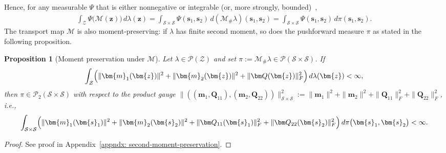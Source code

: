 \documentclass[opre,sglanonrev]{informs4}
\newtheorem{proposition}{Proposition}
\newcommand{\mZ}{\mathcal{Z}}
\newcommand{\mS}{\mathcal{S}}
\newcommand{\mM}{\mathcal{M}}
\newcommand{\mP}{\mathcal{P}}
\newcommand{\bmean}{\bm{m}}
\newcommand{\bs}{\bm{s}}
\newcommand{\bz}{\bm{z}}
\newcommand{\bQ}{\bm Q}
\begin{document}
Hence, for any measurable $\Psi$ that is either nonnegative or integrable (or, more strongly, bounded)~\cite{villani2008optimal},
\begin{align}\label{eq: push-integral-M}
\int_{\mZ}\Psi\!\bigl(\mM(\bz)\bigr)\,d\lambda(\bz)
=\int_{\mS \times \mS }\Psi(\bs_1, \bs_2)\,d(\mM_\#\lambda)(\bs_1, \bs_2)
=\int_{\mS\times \mS}\Psi(\bs_1, \bs_2)\,d\pi(\bs_1, \bs_2).
\end{align}
The transport map $\mM$ is also moment-preserving: if $\lambda$ has finite second moment, so does the pushforward measure $\pi$ as stated in the following proposition. 
\begin{proposition}[Moment preservation under $\mM$]\label{prop: finite-2nd-moment}
Let $\lambda\in \mP(\mZ)$ and set $\pi:=\mM_\#\lambda\in \mP(\mS\times \mS)$. If
\begin{equation}\label{eq:assump-Z-generalQ}
\int_{\mZ}\Bigl(\|\bmean_1(\bz)\|^2+\|\bmean_2(\bz)\|^2+\|\bQ(\bz)\|_F^2\Bigr)\,
d\lambda(\bz) < \infty,
\end{equation}
then $\pi\in \mP_2(\mS\times \mS)$ with respect to the product gauge $\|((\bmean_1,\bQ_{11}),(\bmean_2,\bQ_{22}))\|_{\mS\times \mS}^2
:=\|\bmean_1\|^2+\|\bmean_2\|^2+\|\bQ_{11}\|_F^2+\|\bQ_{22}\|_F^2$, i.e., \begin{equation}\label{eq:concl-SxS-generalQ}
\int_{\mS\times\mS}\Bigl(\|\bmean_1(\bs_1)\|^2+\|\bmean_2(\bs_2)\|^2+\|\bQ_{11}(\bs_1)\|_F^2+\|\bQ_{22}(\bs_2)\|_F^2\Bigr)\,
d\pi\bigl(\bs_1, \bs_2\bigr) < \infty.
\end{equation}
\end{proposition}
\begin{proof}
    See proof in Appendix~\ref{appndx: second-moment-preservation}.
\end{proof}
\end{document}
